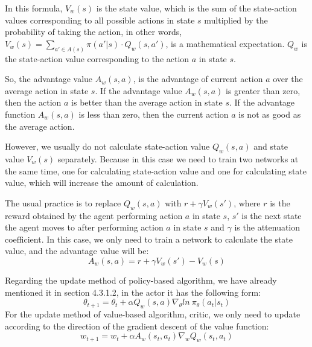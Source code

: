 In this formula, $V_w(s)$ is the state value, which is the sum of the state-action values corresponding to all possible actions in state $s$ multiplied by the probability of taking the action, in other words, $V_w(s)=\sum_{a'\in A(s)}\pi(a'|s)\cdot Q_w(s,a')$, is a mathematical expectation. $Q_w$ is the state-action value corresponding to the action $a$ in state $s$.

So, the advantage value $A_w(s,a)$, is the advantage of current action $a$ over the average action in state $s$. If the advantage value $A_w(s,a)$ is greater than zero, then the action $a$ is better than the average action in state $s$. If the advantage function $A_w(s,a)$ is less than zero, then the current action $a$ is not as good as the average action.

However, we usually do not calculate state-action value $Q_w(s,a)$ and state value $V_w(s)$ separately. Because in this case we need to train two networks at the same time, one for calculating state-action value and one for calculating state value, which will increase the amount of calculation. 

The usual practice is to replace $Q_w(s,a)$ with $r+\gamma V_w(s')$, where $r$ is the reward obtained by the agent performing action $a$ in state $s$, $s'$ is the next state the agent moves to after performing action $a$ in state $s$ and $\gamma$ is the attenuation coefficient. In this case, we only need to train a network to calculate the state value, and the advantage value will be:
$$
A_w(s,a)=r+\gamma V_w(s')-V_w(s)
$$

Regarding the update method of policy-based algorithm, we have already mentioned it in section 4.3.1.2, in the actor it has the following form:
$$
\theta_{t+1}=\theta_t+\alpha Q_w(s,a) \nabla_\theta ln\ \pi_\theta(a_t|s_t)
$$
For the update method of value-based algorithm, critic, we only need to update according to the direction of the gradient descent of the value function:
$$
w_{t+1}=w_t+\alpha A_w(s_t,a_t) \nabla_w Q_w(s_t,a_t)
$$


